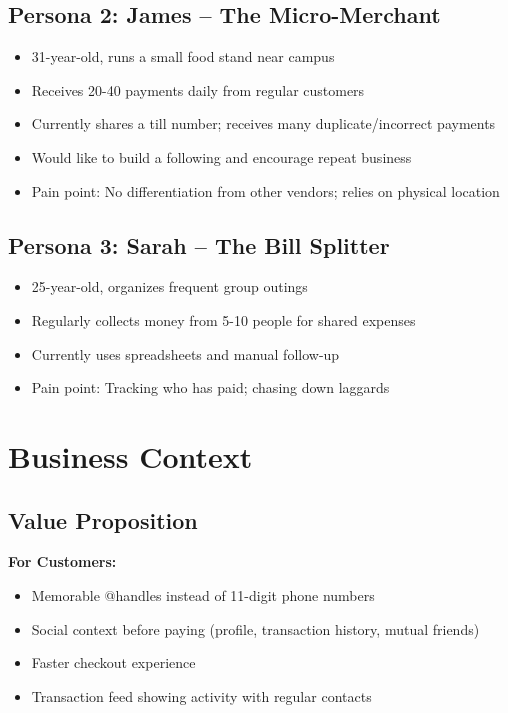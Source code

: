 \documentclass[12pt, a4paper, twoside, openright]{report}
\begin{document}
\subsection{Persona 2: James -- The Micro-Merchant}
\begin{itemize}
    \item 31-year-old, runs a small food stand near campus
    \item Receives 20-40 payments daily from regular customers
    \item Currently shares a till number; receives many duplicate/incorrect payments
    \item Would like to build a following and encourage repeat business
    \item Pain point: No differentiation from other vendors; relies on physical location
\end{itemize}

\subsection{Persona 3: Sarah -- The Bill Splitter}
\begin{itemize}
    \item 25-year-old, organizes frequent group outings
    \item Regularly collects money from 5-10 people for shared expenses
    \item Currently uses spreadsheets and manual follow-up
    \item Pain point: Tracking who has paid; chasing down laggards
\end{itemize}

\section{Business Context}

\subsection{Value Proposition}

\textbf{For Customers:}
\begin{itemize}
    \item Memorable @handles instead of 11-digit phone numbers
    \item Social context before paying (profile, transaction history, mutual friends)
    \item Faster checkout experience
    \item Transaction feed showing activity with regular contacts
\end{itemize}
\end{document}
